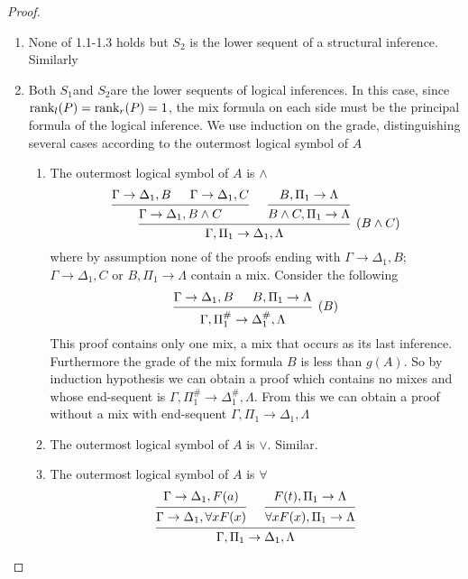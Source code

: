 \documentclass[11pt]{article}
\begin{document}
\begin{proof}
\begin{enumerate}
\begin{enumerate}
\item None of 1.1-1.3 holds but \(S_2\) is the lower sequent of a structural
inference. Similarly
\item Both \(S_1\)and \(S_2\)are the lower sequents of logical inferences. In
this case, since \(\text{rank}_l(P)=\text{rank}_r(P)=1\), the mix formula on each
side must be the principal formula of the logical inference. We use
induction on the grade, distinguishing several cases according to the
outermost logical symbol of \(A\)
\begin{enumerate}
\item The outermost logical symbol of \(A\) is \(\wedge\)
\begin{equation*}
\begin{prooftree}%
\hypo{\Gamma\to\Delta_1,B}
\hypo{\Gamma\to\Delta_1,C}
\infer2{\Gamma\to\Delta_1,B\wedge C}
\hypo{B,\Pi_1\to\Lambda}
\infer1{B\wedge C,\Pi_1\to \Lambda}
\infer2[(\(B\wedge C\))]{\Gamma,\Pi_1\to\Delta_1,\Lambda}
\end{prooftree}
\end{equation*}
where by assumption none of the proofs ending with
\(\Gamma\to\Delta_1,B\);\(\Gamma\to\Delta_1,C\) or
\(B,\Pi_1\to\Lambda\) contain a mix. Consider the following
\begin{equation*}
\begin{prooftree}%
\hypo{\Gamma\to\Delta_1,B}
\hypo{B,\Pi_1\to\Lambda}
\infer2[\((B)\)]{\Gamma,\Pi_1^\#\to\Delta_1^\#,\Lambda}
\end{prooftree}
\end{equation*}
This proof contains only one mix, a mix that occurs as its last
inference. Furthermore the grade of the mix formula \(B\) is less
than \(g(A)\). So by induction hypothesis we can obtain a proof
which contains no mixes and whose end-sequent is
\(\Gamma,\Pi_1^\#\to\Delta_1^\#,\Lambda\). From this we can obtain a proof
without a mix with end-sequent \(\Gamma,\Pi_1\to\Delta_1,\Lambda\)
\item The outermost logical symbol of \(A\) is \(\vee\). Similar.
\item The outermost logical symbol of \(A\) is \(\forall\) 
\begin{equation*}
\begin{prooftree}%
\hypo{\Gamma\to\Delta_1,F(a)}
\infer1{\Gamma\to\Delta_1,\forall xF(x)}
\hypo{F(t),\Pi_1\to\Lambda}
\infer1{\forall xF(x),\Pi_1\to\Lambda}
\infer2{\Gamma,\Pi_1\to\Delta_1,\Lambda}
\end{prooftree}
\end{equation*}

\end{enumerate}
\end{enumerate}
\end{enumerate}
\end{proof}
\end{document}
